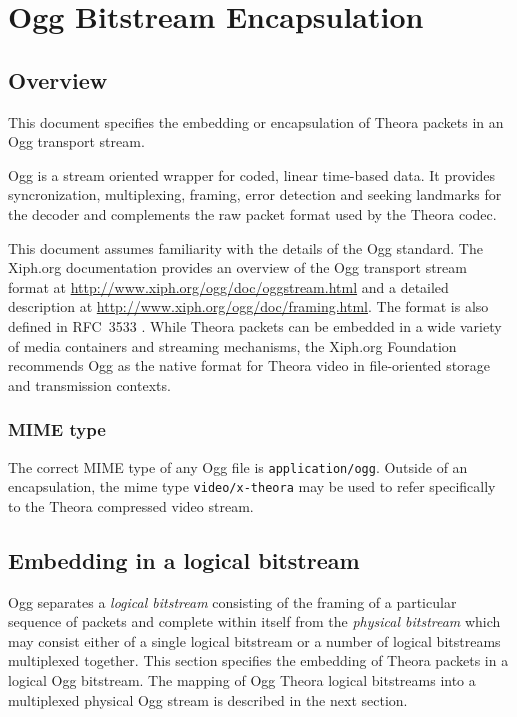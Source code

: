 \documentclass[11pt,letterpaper]{book}
\numberwithin{equation}{chapter}
\numberwithin{figure}{chapter}
\numberwithin{table}{chapter}
\begin{document}
\clearpage

\appendix

\chapter{Ogg Bitstream Encapsulation}
\label{app:oggencapsulation}

\section{Overview}

This document specifies the embedding or encapsulation of Theora packets
 in an Ogg transport stream.

Ogg is a stream oriented wrapper for coded, linear time-based data.
It provides syncronization, multiplexing, framing, error detection and
 seeking landmarks for the decoder and complements the raw packet format
 used by the Theora codec.

This document assumes familiarity with the details of the Ogg standard.
The Xiph.org documentation provides an overview of the Ogg transport stream
 format at \url{http://www.xiph.org/ogg/doc/oggstream.html} and a detailed
 description at \url{http://www.xiph.org/ogg/doc/framing.html}.
The format is also defined in RFC~3533 \cite{rfc3533}.
While Theora packets can be embedded in a wide variety of media
 containers and streaming mechanisms, the Xiph.org Foundation
 recommends Ogg as the native format for Theora video in file-oriented
 storage and transmission contexts.

\subsection{MIME type}

The correct MIME type of any Ogg file is {\tt application/ogg}.
Outside of an encapsulation, the mime type {\tt video/x-theora} may
 be used to refer specifically to the Theora compressed video stream.

\section{Embedding in a logical bitstream}

Ogg separates a {\em logical bitstream} consisting of the framing of
 a particular sequence of packets and complete within itself from
 the {\em physical bitstream} which may consist either of a single
 logical bitstream or a number of logical bitstreams multiplexed
 together.
This section specifies the embedding of Theora packets in a logical Ogg
 bitstream.
The mapping of Ogg Theora logical bitstreams into a multiplexed physical Ogg
 stream is described in the next section.
\end{document}
